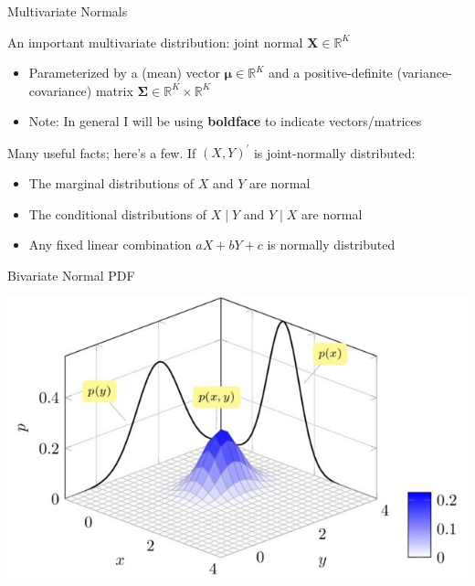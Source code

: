 \documentclass[11pt,english,handout]{beamer}
\begin{document}
\begin{frame}{Multivariate Normals}

\vspace{0.2cm}
An important multivariate distribution: joint normal $\mathbf{X}\in\mathbb{R}^K$

\begin{itemize}
\item Parameterized by a (mean) vector $\boldsymbol{\mu}\in\mathbb{R}^K$ and a positive-definite (variance-covariance) matrix $\boldsymbol{\Sigma}\in\mathbb{R}^K\times\mathbb{R}^K$
\vspace{0.1cm}
\item Note: In general I will be using \textbf{boldface} to indicate vectors/matrices
\end{itemize}

\vspace{0.4cm}\pause{}

Many useful facts; here's a few. If $(X,Y)^\prime$ is joint-normally distributed:

\begin{itemize}
\item The marginal distributions of $X$ and $Y$ are normal
\vspace{0.1cm}
\item The conditional distributions of $X\mid Y$ and $Y\mid X$ are normal
\vspace{0.1cm}
\item Any fixed linear combination $aX+bY+c$ is normally distributed
\end{itemize}

\end{frame}


\begin{frame}{Bivariate Normal PDF}
\begin{center}
\includegraphics[scale=1.5]{binormal.jpg}
\end{center}
\end{frame}
\end{document}

